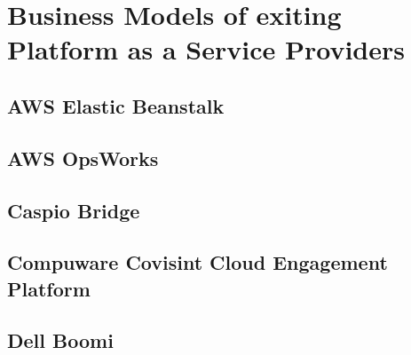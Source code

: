 \chapter{Business Models of exiting Platform as a Service Providers}\label{ch:app01}

\section{AWS Elastic Beanstalk}


\newpage
\section{AWS OpsWorks}


\section{Caspio Bridge}


%

\section{Compuware Covisint Cloud Engagement Platform}


\section{Dell Boomi}


%

%

